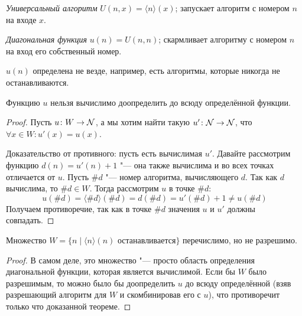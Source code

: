 \begin{Def}
	\textit{Универсальный алгоритм} $U(n, x) = \langle n \rangle (x)$; запускает алгоритм с номером $n$ на входе $x$.
\end{Def}
\begin{Def}
	\textit{Диагональная функция} $u(n) = U(n, n)$; скармливает алгоритму с номером $n$ на вход его собственный номер.
\end{Def}
\begin{Rem}
	$u(n)$ определена не везде, например, есть алгоритмы, которые никогда не останавливаются.
\end{Rem}

\begin{theorem}
	Функцию $u$ нельзя вычислимо доопределить до всюду определённой функции.
\end{theorem}
\begin{proof}
	Пусть $u \colon W \to \mathcal{N}$, а мы хотим найти такую $u' \colon \mathcal{N} \to \mathcal{N}$, что $\forall x \in W \colon u'(x)=u(x)$.

	Доказательство от противного: пусть есть вычислимая $u'$.
	Давайте рассмотрим функцию $d(n)=u'(n)+1$ "--- она также вычислима и во всех точках отличается от $u$.
	Пусть $\#d$ "--- номер алгоритма, вычисляющего $d$.
	Так как $d$ вычислима, то $\#d \in W$.
	Тогда рассмотрим $u$ в точке $\#d$:
	\[ u(\#d) = \langle \#d \rangle (\#d) = d(\#d) = u'(\#d) + 1 \neq u(\#d) \]
	Получаем противоречие, так как в точке $\#d$ значения $u$ и $u'$ должны совпадать.
\end{proof}


\begin{conseq}
	Множество $W = \{n \mid \langle n \rangle(n)\text{~останавливается}\}$ перечислимо, но не разрешимо.
\end{conseq}
\begin{proof}
	В самом деле, это множество "--- просто область определения диагональной функции, которая является вычислимой.
	Если бы $W$ было разрешимым, то можно было бы доопределить $u$ до всюду определённой (взяв разрешающий алгоритм для $W$ и скомбинировав его с $u$),
	что противоречит только что доказанной теореме.
\end{proof}

